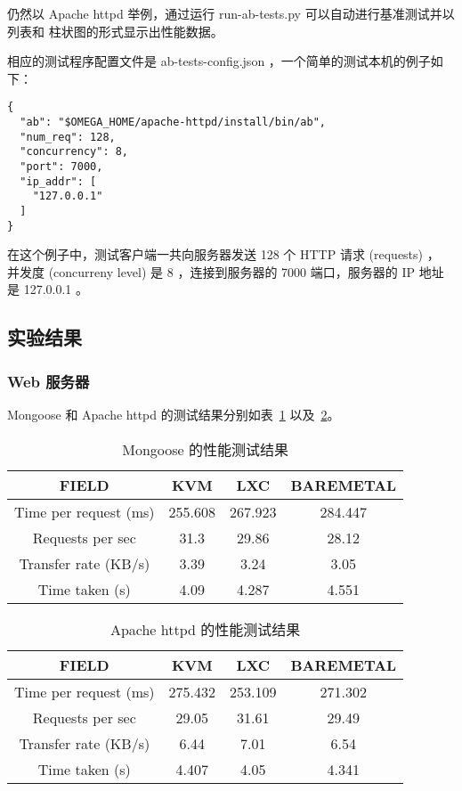 仍然以 Apache httpd 举例，通过运行 run-ab-tests.py 可以自动进行基准测试并以列表和
柱状图的形式显示出性能数据。

相应的测试程序配置文件是 ab-tests-config.json ，一个简单的测试本机的例子如下：

\begin{lstlisting}
{
  "ab": "$OMEGA_HOME/apache-httpd/install/bin/ab",
  "num_req": 128,
  "concurrency": 8,
  "port": 7000,
  "ip_addr": [
    "127.0.0.1"
  ]
}
\end{lstlisting}

在这个例子中，测试客户端一共向服务器发送 128 个 HTTP 请求 (requests) ，
并发度 (concurreny level) 是 8 ，连接到服务器的 7000 端口，服务器的 IP 地址是
127.0.0.1 。

\subsection{实验结果}

\subsubsection{Web 服务器}

Mongoose 和 Apache httpd 的测试结果分别如表~\ref{tab:mongoose-perf}
以及~\ref{tab:apache-perf}。

\begin{table}[h]
    \centering
    \caption{Mongoose 的性能测试结果}
    \begin{tabular}{||c c c c||}
        \hline
        FIELD & KVM & LXC & BAREMETAL \\
        \hline
        \hline
        Time per request (ms) & 255.608 & 267.923 & 284.447 \\
        \hline
        Requests per sec & 31.3 & 29.86 & 28.12 \\
        \hline
        Transfer rate (KB/s) & 3.39 & 3.24 & 3.05 \\
        \hline
        Time taken (s) & 4.09 & 4.287 & 4.551 \\
        \hline
    \end{tabular}
    \label{tab:mongoose-perf}
\end{table}

\begin{table}[h]
    \centering
    \caption{Apache httpd 的性能测试结果}
    \begin{tabular}{||c c c c||}
        \hline
        FIELD & KVM & LXC & BAREMETAL \\
        \hline
        \hline
        Time per request (ms) & 275.432 & 253.109 & 271.302 \\
        \hline
        Requests per sec & 29.05 & 31.61 & 29.49 \\
        \hline
        Transfer rate (KB/s) & 6.44 & 7.01 & 6.54 \\
        \hline
        Time taken (s) & 4.407 & 4.05 & 4.341 \\
        \hline
    \end{tabular}
    \label{tab:apache-perf}
\end{table}

